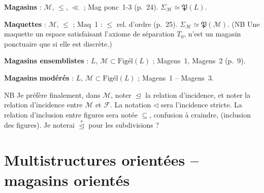 \documentclass[11pt,a4paper]{article}
\begin{document}
\textbf{Magasins}   : $\mathcal{M}$, $\leq$, $\ll$ ; Mag ponc~1-3 (p.~24). $\Sigma_{\mathcal{M}} \simeq \mathfrak{P}(L)$.


\textbf{Maquettes} : $\mathcal{M}$, $\leq$ ; Maq~1 : $\leq$ rel. d'ordre (p.~25). $\Sigma_{\mathcal{M}} \simeq \mathfrak{P}(\mathcal{M})$.
(NB Une maquette   un espace  satisfaisant l'axiome de séparation $T_0$, n'est un magasin \struck{\ill{}} ponctuaire que si elle est discrète.)

\textbf{Magasins ensemblistes} : $L$, $\mathcal{M} \subset \mathrm{Figél}(L)$ ; Magens~1, Magens~2 (p.~9).

\textbf{Magasins}  \textbf{modérés} : $L$, $\mathcal{M} \subset \mathrm{Figél}(L)$ ; Magens~1 -- Magens~3.



NB Je préfère finalement, dans $\mathcal{M}$, noter $\trianglelefteq$ la relation d'incidence, et noter \struck{\ill{}}  la relation d'incidence entre $\mathcal{M}$ et $\mathcal{F}$. La notation $\lhd$ sera l'incidence stricte. La relation d'inclusion entre figures sera notée \struck{\ill{}} $\subseteq$,  confusion à craindre, \struck{\ill{}} (inclusion des figures). Je noterai $\overset{s}{\trianglelefteq}$ pour les subdivisions ?

\section{Multistructures orientées -- magasins orientés}
\end{document}
